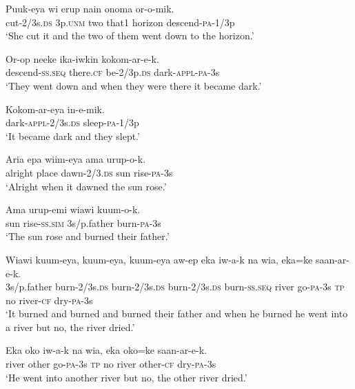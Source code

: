 \ea\label{ex:a:x26}
\gll  Puuk-eya  wi  erup  nain  onoma  or-o-mik. \\
cut-2/3s.\textsc{ds}  3p.\textsc{unm}  two  that1  horizon  descend-\textsc{pa}-1/3p \\
\glt ‘She cut it and the two of them went down to the horizon.’ \\
\z


\ea\label{ex:a:x27}
\gll  Or-op  neeke  ika-iwkin  kokom-ar-e-k. \\
descend-\textsc{ss.seq}  there.\textsc{cf}  be-2/3p.\textsc{ds}  dark-\textsc{appl}-\textsc{pa}-3s \\
\glt ‘They went down and when they were there it became dark.’ \\
\z


\ea\label{ex:a:x28}
\gll  Kokom-ar-eya  in-e-mik. \\
dark-\textsc{appl}-2/3s.\textsc{ds}  sleep-\textsc{pa}-1/3p \\
\glt ‘It became dark and they slept.’ \\
\z


\ea\label{ex:a:x29}
\gll  Aria  epa  wiim-eya  ama  urup-o-k. \\
alright  place  dawn-2/3.\textsc{ds}  sun  rise-\textsc{pa}-3s \\
\glt ‘Alright when it dawned the sun rose.’ \\
\z


\ea\label{ex:a:x30}
\gll  Ama  urup-emi  wiawi  kuum-o-k. \\
sun  rise-\textsc{ss}.\textsc{sim}  3s/p.father  burn-\textsc{pa}-3s \\
\glt ‘The sun rose and burned their father.’ \\
\z


\ea\label{ex:a:x31}
\gll  Wiawi  kuum-eya,  kuum-eya,  kuum-eya  aw-ep                  eka  iw-a-k  na  wia,  eka=ke  saan-ar-e-k. \\
3s/p.father  burn-2/3s.\textsc{ds}  burn-2/3s.\textsc{ds}  burn-2/3s.\textsc{ds}  burn-\textsc{ss.seq}  river  go-\textsc{pa}-3s  \textsc{tp}  no  river-\textsc{cf}  dry-\textsc{pa}-3s \\


\glt ‘It burned and burned and burned their father and when he burned he went into a river but no, the river dried.’ \\
\z


\ea\label{ex:a:x32}
\gll  Eka  oko  iw-a-k  na  wia,  eka  oko=ke  saan-ar-e-k. \\
river  other  go-\textsc{pa}-3s  \textsc{tp}  no  river  other-\textsc{cf}  dry-\textsc{pa}-3s \\
\glt ‘He went into another river but no, the other river dried.’ \\
\z


